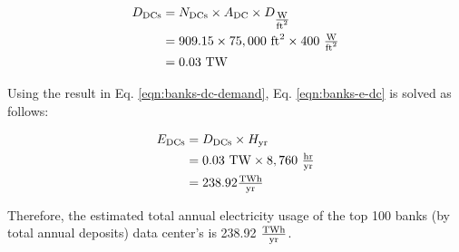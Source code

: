 \begin{align}\label{eqn:banks-dc-demand-res}
  D_\textrm{DCs} &= N_\textrm{DCs} \times A_\textrm{DC} \times D_{\wA} \nonumber \\
                 &= 909.15 \times 75,000 \textrm{ ft}^2 \times 400 \ \wA \nonumber \\
                 &= 0.03 \textrm{ TW}
\end{align}

Using the result in Eq. \eqref{eqn:banks-dc-demand}, Eq. \eqref{eqn:banks-e-dc} is solved as follows:

\begin{align}\label{eqn:banks-e-dc-res}
  E_\textrm{DCs} &= D_\textrm{DCs} \times H_\textrm{yr} \nonumber \\
                 &= 0.03 \textrm{ TW} \times 8,760 \ \tfrac{ \textrm{hr} } { \textrm{yr} } \nonumber \\
                 &= 238.92 \tfrac{ \textrm{{T}Wh} } { \textrm{yr} }
\end{align}

Therefore, the estimated total annual electricity usage of the top 100 banks (by total annual deposits) data center's is 238.92 $\tfrac{ \textrm{{T}Wh} } { \textrm{yr} }$.

